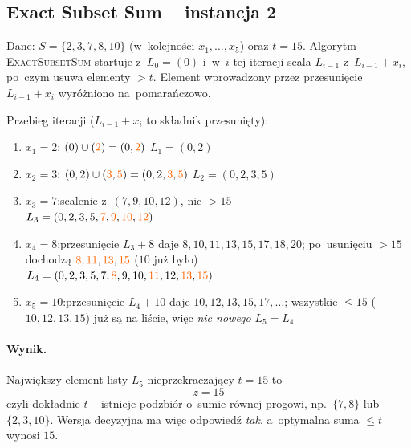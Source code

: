 \subsection{Exact Subset Sum -- instancja 2}

Dane: $S = \{2, 3, 7, 8, 10\}$ (w~kolejności $x_1, \ldots, x_5$) oraz $t = 15$.
Algorytm \textsc{ExactSubsetSum} startuje z~$L_0 = (0)$ i~w~$i$-tej iteracji scala
$L_{i-1}$ z~$L_{i-1} + x_i$, po~czym usuwa elementy $> t$. Element wprowadzony
przez przesunięcie $L_{i-1} + x_i$ wyróżniono na~\textcolor{accentB}{pomarańczowo}.

\begin{dygresja}
	Przebieg iteracji ($L_{i-1} + x_i$ to składnik przesunięty):
	\begin{enumerate}[nosep]
		\item $x_1 = 2$:\quad
		      $(0) \cup (\textcolor{accentB}{2}) = (0, \textcolor{accentB}{2})$
		      \hfill $L_1 = (0, 2)$
		\item $x_2 = 3$:\quad
		      $(0, 2) \cup (\textcolor{accentB}{3}, \textcolor{accentB}{5})
		      = (0, 2, \textcolor{accentB}{3}, \textcolor{accentB}{5})$
		      \hfill $L_2 = (0, 2, 3, 5)$
		\item $x_3 = 7$:\quad scalenie z~$(7, 9, 10, 12)$, nic $> 15$
		      \hfill\\
		      $L_3 = (0, 2, 3, 5, \textcolor{accentB}{7}, \textcolor{accentB}{9},
		      \textcolor{accentB}{10}, \textcolor{accentB}{12})$
		\item $x_4 = 8$:\quad przesunięcie $L_3 + 8$ daje
		      $8, 10, 11, 13, 15, 17, 18, 20$; po~usunięciu $> 15$ dochodzą
		      $\textcolor{accentB}{8}, \textcolor{accentB}{11}, \textcolor{accentB}{13},
		      \textcolor{accentB}{15}$ ($10$ już było) \\
		      $L_4 = (0, 2, 3, 5, 7, \textcolor{accentB}{8}, 9, 10,
		      \textcolor{accentB}{11}, 12, \textcolor{accentB}{13}, \textcolor{accentB}{15})$
		\item $x_5 = 10$:\quad przesunięcie $L_4 + 10$ daje
		      $10, 12, 13, 15, 17, \ldots$; wszystkie $\leq 15$ ($10, 12, 13, 15$) już
		      są na liście, więc \emph{nic nowego}
		      \hfill $L_5 = L_4$
	\end{enumerate}
\end{dygresja}

\paragraph{Wynik.}
Największy element listy $L_5$ nieprzekraczający $t = 15$ to
\[
	\boxed{z = 15}
\]
czyli dokładnie $t$ -- istnieje podzbiór o~sumie równej progowi, np.\
$\{7, 8\}$ lub $\{2, 3, 10\}$. Wersja decyzyjna ma więc odpowiedź \emph{tak},
a~optymalna suma $\leq t$ wynosi $15$.
